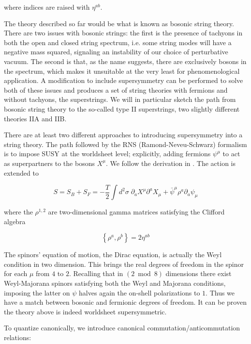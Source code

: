 where indices are raised with $\eta^{ab}$.

The theory described so far would be what is known as bosonic string theory. There are two issues with bosonic strings: the first is the presence of tachyons in both the open and closed string spectrum, i.e. some string modes will have a negative mass squared, signaling an instability of our choice of perturbative vacuum. The second is that, as the name suggests, there are exclusively bosons in the spectrum, which makes it unsuitable at the very least for phenomenological application. A modification to include supersymmetry can be performed to solve both of these issues and produces a set of string theories with fermions and without tachyons, the superstrings. We will in particular sketch the path from bosonic string theory to the so-called type II superstrings, two slightly different theories IIA and IIB.

There are at least two different approaches to introducing supersymmetry into a string theory. The path followed by the RNS (Ramond-Neveu-Schwarz) formalism is to impose SUSY at the worldsheet level; explicitly, adding fermions $\psi^\mu$ to act as superpartners to the bosons $X^\mu$. We follow the derivation in \cite{BBS}. The action is extended to

\begin{equation}
S = S_B + S_F = -\frac{T}{2} \int d^2\sigma \; \partial_a X^\mu \partial^a X_\mu + \bar \psi^\mu \rho^a \partial_a \psi_\mu
\end{equation}

where the $\rho^{1,2}$ are two-dimensional gamma matrices satisfying the Clifford algebra

\begin{equation}
	\left\{ \rho^a,\rho^b \right\} = 2\eta^{ab}
	\label{}
\end{equation}

The spinors' equation of motion, the Dirac equation, is actually the Weyl condition in two dimension. This brings the real degrees of freedom in the spinor for each $\mu$ from $4$ to $2$. Recalling that in $(2\bmod 8)$ dimensions there exist Weyl-Majorana spinors satisfying both the Weyl and Majorana conditions, imposing the latter on $\psi$ halves again the on-shell polarizations to $1$. Thus we have a match between bosonic and fermionic degrees of freedom. It can be proven the theory above is indeed worldsheet supersymmetric.

To quantize canonically, we introduce canonical commutation/anticommutation relations:

